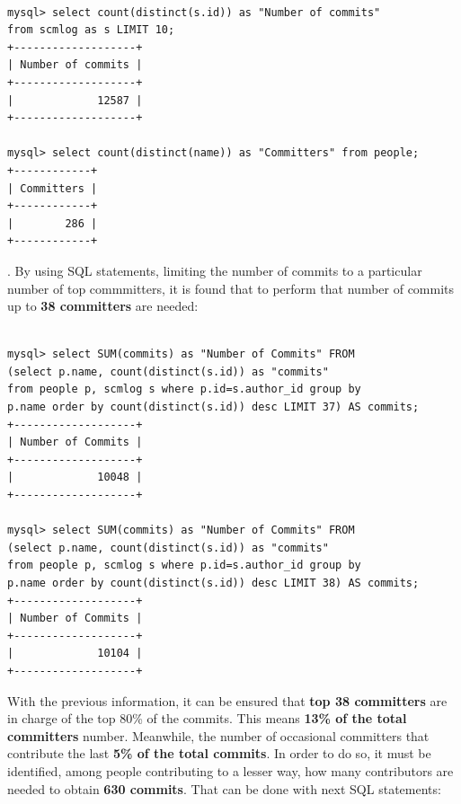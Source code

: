 \documentclass[a4paper, 12pt]{book}
\begin{document}
\begin{verbatim}

mysql> select count(distinct(s.id)) as "Number of commits"
from scmlog as s LIMIT 10;
+-------------------+
| Number of commits |
+-------------------+
|             12587 |
+-------------------+

mysql> select count(distinct(name)) as "Committers" from people;
+------------+
| Committers |
+------------+
|        286 |
+------------+

\end{verbatim}

. By using SQL statements, limiting the number of commits to a particular number of top commmitters, it is found that to perform that number of commits up to \textbf{38 committers} are needed:

\begin{verbatim}

mysql> select SUM(commits) as "Number of Commits" FROM
(select p.name, count(distinct(s.id)) as "commits"
from people p, scmlog s where p.id=s.author_id group by
p.name order by count(distinct(s.id)) desc LIMIT 37) AS commits;
+-------------------+
| Number of Commits |
+-------------------+
|             10048 |
+-------------------+

mysql> select SUM(commits) as "Number of Commits" FROM
(select p.name, count(distinct(s.id)) as "commits"
from people p, scmlog s where p.id=s.author_id group by
p.name order by count(distinct(s.id)) desc LIMIT 38) AS commits;
+-------------------+
| Number of Commits |
+-------------------+
|             10104 |
+-------------------+

\end{verbatim}
With the previous information, it can be ensured that \textbf{top 38 committers} are in charge of the top 80\% of the commits. This means \textbf{13\% of the total committers} number. Meanwhile, the number of occasional committers that contribute the last \textbf{5\% of the total commits}. In order to do so, it must be identified, among people contributing to a lesser way, how many contributors are needed to obtain \textbf{630 commits}. That can be done with next SQL statements:
\end{document}
